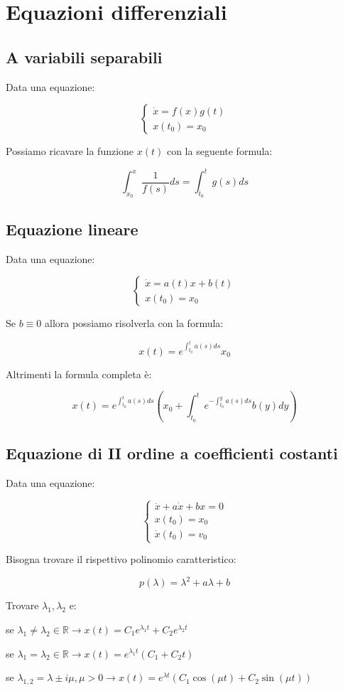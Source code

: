 \documentclass{article}
\begin{document}
\section{Equazioni differenziali}

\subsection{A variabili separabili}

Data una equazione:

$$
\begin{cases}
\dot{x} = f(x)g(t)\\
x(t_0) = x_0
\end{cases}
$$

\noindent
Possiamo ricavare la funzione $x(t)$ con la seguente formula:

$$
\int^{x}_{x_0}\frac{1}{f(s)}ds = \int^{t}_{t_0}g(s)ds
$$

\subsection{Equazione lineare}

Data una equazione:

$$
\begin{cases}
\dot{x} = a(t)x + b(t)\\
x(t_0) = x_0
\end{cases}
$$

\noindent
Se $b \equiv 0$ allora possiamo risolverla con la formula:

$$
x(t) = e^{\int^{t}_{t_0}a(s)ds}x_0
$$

\noindent
Altrimenti la formula completa è:

$$
x(t) = e^{\int^{t}_{t_0}a(s)ds}(x_0 + \int^{t}_{t_0}e^{-\int^{y}_{t_0}a(s)ds}b(y)dy)
$$

\subsection{Equazione di II ordine a coefficienti costanti}

Data una equazione:

$$
\begin{cases}
\ddot{x} + a\dot{x} + bx = 0\\
x(t_0) = x_0\\
\dot{x}(t_0) = v_0
\end{cases}
$$

\noindent
Bisogna trovare il rispettivo polinomio caratteristico:

$$
p(\lambda) = \lambda^2 + a\lambda + b
$$

\noindent
Trovare $\lambda_1, \lambda_2$ e:

\begin{description}
    \item se $\lambda_1 \neq \lambda_2 \in \mathbb{R} \to x(t) = C_1e^{\lambda_1t} + C_2e^{\lambda_2t}$
    \item se $\lambda_1 = \lambda_2 \in \mathbb{R} \to x(t) = e^{\lambda_1t}(C_1 + C_2t)$
    \item se $\lambda_{1,2} = \lambda \pm i\mu, \mu > 0 \to x(t) = e^{\lambda t}(C_1\cos(\mu t) + C_2\sin(\mu t))$
\end{description}
\end{document}
